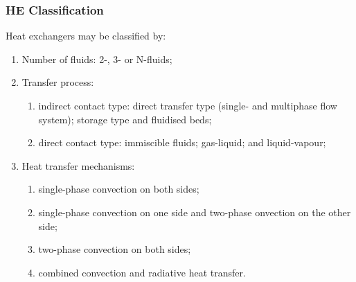 \documentclass[10pt,compress,unknownkeysallowed]{beamer}
\begin{document}
\begin{frame}
 \frametitle{HE Classification}
    Heat exchangers may be classified by:
      \begin{enumerate}%
          \item<1-> Number of fluids: 2-, 3- or N-fluids;
          \item<2-> Transfer process:
             \begin{enumerate}
                 \item<2-> indirect contact type: direct transfer type (\ie single- and multiphase flow system); storage type and fluidised beds;
                 \item<2-> direct contact type: immiscible fluids; gas-liquid; and liquid-vapour;
             \end{enumerate}
          \item<3-> Heat transfer mechanisms:
             \begin{enumerate}
                 \item<3-> single-phase convection on both sides;  
                 \item<3-> single-phase convection on one side and two-phase onvection on the other side; 
                 \item<3-> two-phase convection on both sides;
                 \item<3-> combined convection and radiative heat transfer.
             \end{enumerate}
   \end{enumerate}
\end{frame}
\end{document}
